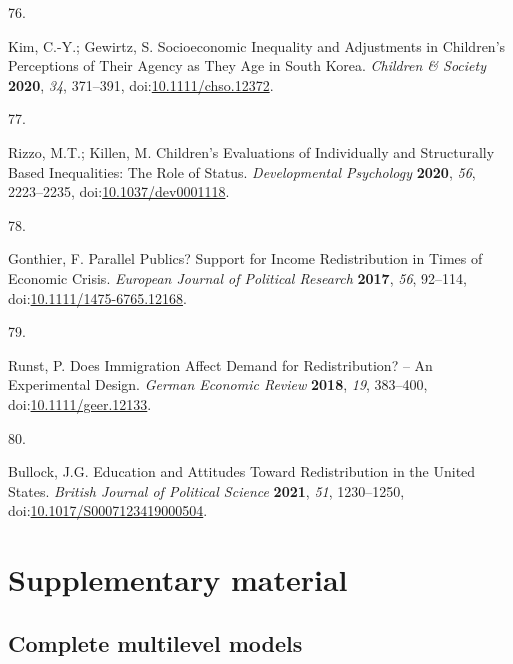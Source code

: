 \documentclass[
  12pt,
  letterpaper,
]{article}
\newlength{\cslhangindent}
\newlength{\csllabelwidth}
\newenvironment{CSLReferences}[2] %
 {\begin{list}{}{%
  \setlength{\itemindent}{0pt}
  \setlength{\leftmargin}{0pt}
  \setlength{\parsep}{0pt}
  \ifodd #1
   \setlength{\leftmargin}{\cslhangindent}
   \setlength{\itemindent}{-1\cslhangindent}
  \fi
  \setlength{\itemsep}{#2\baselineskip}}}
 {\end{list}}
\newcommand{\CSLLeftMargin}[1]{\parbox[t]{\csllabelwidth}{\strut#1\strut}}
\newcommand{\CSLRightInline}[1]{\parbox[t]{\linewidth - \csllabelwidth}{\strut#1\strut}}
\begin{document}
\begin{CSLReferences}{0}{0}
\CSLLeftMargin{76. }%
\CSLRightInline{Kim, C.-Y.; Gewirtz, S. Socioeconomic Inequality and
Adjustments in Children's Perceptions of Their Agency as They Age in
{South Korea}. \emph{Children \& Society} \textbf{2020}, \emph{34},
371--391,
doi:\href{https://doi.org/10.1111/chso.12372}{10.1111/chso.12372}.}

\CSLLeftMargin{77. }%
\CSLRightInline{Rizzo, M.T.; Killen, M. Children's Evaluations of
Individually and Structurally Based Inequalities: {The} Role of Status.
\emph{Developmental Psychology} \textbf{2020}, \emph{56}, 2223--2235,
doi:\href{https://doi.org/10.1037/dev0001118}{10.1037/dev0001118}.}

\CSLLeftMargin{78. }%
\CSLRightInline{Gonthier, F. Parallel Publics? {Support} for Income
Redistribution in Times of Economic Crisis. \emph{European Journal of
Political Research} \textbf{2017}, \emph{56}, 92--114,
doi:\href{https://doi.org/10.1111/1475-6765.12168}{10.1111/1475-6765.12168}.}

\CSLLeftMargin{79. }%
\CSLRightInline{Runst, P. Does {Immigration Affect Demand} for
{Redistribution}? -- {An Experimental Design}. \emph{German Economic
Review} \textbf{2018}, \emph{19}, 383--400,
doi:\href{https://doi.org/10.1111/geer.12133}{10.1111/geer.12133}.}

\CSLLeftMargin{80. }%
\CSLRightInline{Bullock, J.G. Education and {Attitudes} Toward
{Redistribution} in the {United States}. \emph{British Journal of
Political Science} \textbf{2021}, \emph{51}, 1230--1250,
doi:\href{https://doi.org/10.1017/S0007123419000504}{10.1017/S0007123419000504}.}

\end{CSLReferences}

\newpage{}

\section{Supplementary material}\label{supplementary-material}

\subsection{Complete multilevel
models}\label{complete-multilevel-models}
\end{document}
